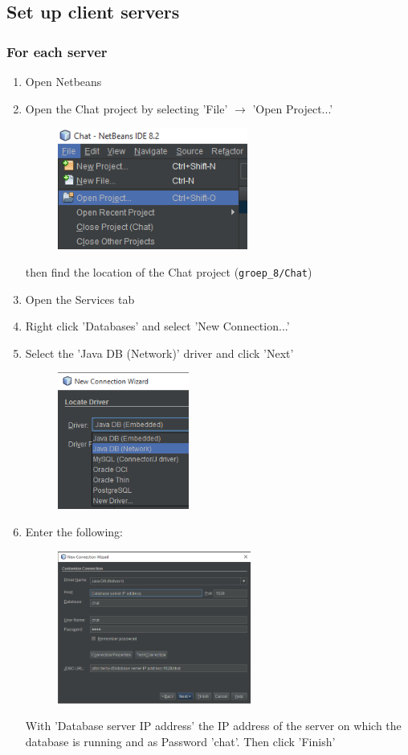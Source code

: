 \documentclass[11pt]{article}
\begin{document}
\subsection{Set up client servers}
\subsubsection{For each server}
\begin{enumerate}
	\item Open Netbeans
	\item Open the Chat project by selecting 'File' $\rightarrow$ 'Open Project...'
	\begin{figure}[H]
		\centering
		\includegraphics[height=40mm]{open_project.png}
	\end{figure}
	then find the location of the Chat project (\texttt{groep\_8/Chat})
	\item Open the Services tab
	\item Right click 'Databases' and select 'New Connection...'
	\item Select the 'Java DB (Network)' driver and click 'Next'
	\begin{figure}[H]
		\centering
		\includegraphics[height=45mm]{select_db_driver.png}
	\end{figure}
	\item Enter the following:
	\begin{figure}[H]
		\centering
		\includegraphics[height=50mm]{new_db_connection.png}
	\end{figure}
	With 'Database server IP address' the IP address of the server on which the database is running and as Password 'chat'. Then click 'Finish'
	


\end{enumerate}
\end{document}
